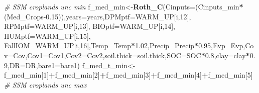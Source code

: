 \documentclass[
  10pt,
  b5paper,
]{book}
\newenvironment{Shaded}{\begin{snugshade}}{\end{snugshade}}
\newcommand{\CommentTok}[1]{\textcolor[rgb]{0.56,0.35,0.01}{\textit{#1}}}
\newcommand{\DataTypeTok}[1]{\textcolor[rgb]{0.13,0.29,0.53}{#1}}
\newcommand{\DecValTok}[1]{\textcolor[rgb]{0.00,0.00,0.81}{#1}}
\newcommand{\FloatTok}[1]{\textcolor[rgb]{0.00,0.00,0.81}{#1}}
\newcommand{\KeywordTok}[1]{\textcolor[rgb]{0.13,0.29,0.53}{\textbf{#1}}}
\newcommand{\NormalTok}[1]{#1}
\newcommand{\OperatorTok}[1]{\textcolor[rgb]{0.81,0.36,0.00}{\textbf{#1}}}
\begin{document}
\begin{Shaded}
\begin{Highlighting}[]
\CommentTok{# SSM croplands unc min}
\NormalTok{f_med_min<-}\KeywordTok{Roth_C}\NormalTok{(}\DataTypeTok{Cinputs=}\NormalTok{(Cinputs_min}\OperatorTok{*}\NormalTok{(Med_Crops}\FloatTok{-0.15}\NormalTok{)),}\DataTypeTok{years=}\NormalTok{years,}\DataTypeTok{DPMptf=}\NormalTok{WARM_UP[i,}\DecValTok{12}\NormalTok{], }\DataTypeTok{RPMptf=}\NormalTok{WARM_UP[i,}\DecValTok{13}\NormalTok{], }\DataTypeTok{BIOptf=}\NormalTok{WARM_UP[i,}\DecValTok{14}\NormalTok{], }\DataTypeTok{HUMptf=}\NormalTok{WARM_UP[i,}\DecValTok{15}\NormalTok{], }\DataTypeTok{FallIOM=}\NormalTok{WARM_UP[i,}\DecValTok{16}\NormalTok{],}\DataTypeTok{Temp=}\NormalTok{Temp}\OperatorTok{*}\FloatTok{1.02}\NormalTok{,}\DataTypeTok{Precip=}\NormalTok{Precip}\OperatorTok{*}\FloatTok{0.95}\NormalTok{,}\DataTypeTok{Evp=}\NormalTok{Evp,}\DataTypeTok{Cov=}\NormalTok{Cov,}\DataTypeTok{Cov1=}\NormalTok{Cov1,}\DataTypeTok{Cov2=}\NormalTok{Cov2,}\DataTypeTok{soil.thick=}\NormalTok{soil.thick,}\DataTypeTok{SOC=}\NormalTok{SOC}\OperatorTok{*}\FloatTok{0.8}\NormalTok{,}\DataTypeTok{clay=}\NormalTok{clay}\OperatorTok{*}\FloatTok{0.9}\NormalTok{,}\DataTypeTok{DR=}\NormalTok{DR,}\DataTypeTok{bare1=}\NormalTok{bare1)}
\NormalTok{f_med_t_min<-f_med_min[}\DecValTok{1}\NormalTok{]}\OperatorTok{+}\NormalTok{f_med_min[}\DecValTok{2}\NormalTok{]}\OperatorTok{+}\NormalTok{f_med_min[}\DecValTok{3}\NormalTok{]}\OperatorTok{+}\NormalTok{f_med_min[}\DecValTok{4}\NormalTok{]}\OperatorTok{+}\NormalTok{f_med_min[}\DecValTok{5}\NormalTok{]}
\CommentTok{# SSM croplands unc max}


\end{Highlighting}
\end{Shaded}
\end{document}
